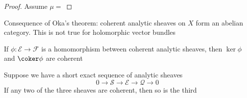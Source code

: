 \documentclass[../main.tex]{subfiles}
\begin{document}
\begin{proof}
Assume $\mu=$
\end{proof}

Consequence of Oka's theorem: coherent analytic sheaves on $X$ form an abelian category. This is not true for holomorphic vector bundles

\begin{proposition}
If $\phi:\mathcal E\to\mathcal F$ is a homomorphism between coherent analytic sheaves, then $\ker\phi$ and $\coker\phi$ are coherent
\end{proposition}

\begin{proposition}
Suppose we have a short exact sequence of analytic sheaves
\[0\to\mathcal S\to\mathcal E\to\mathcal Q\to0\]
If any two of the three sheaves are coherent, then so is the third
\end{proposition}
\end{document}
